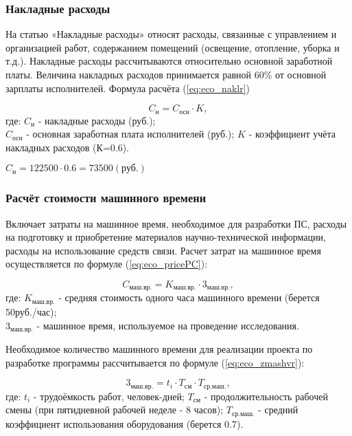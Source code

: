 \subsubsection*{Накладные расходы}
На статью «Накладные расходы» относят расходы, связанные с управлением и организацией работ, содержанием помещений
(освещение, отопление, уборка и т.д.). Накладные расходы рассчитываются относительно основной заработной платы. Величина
накладных расходов принимается равной 60\% от основной зарплаты исполнителей. Формула расчёта (\ref{eq:eco_naklr})

\begin{equation}
C_{\mbox{н}} = C_{\mbox{осн}} \cdot K,
\label{eq:eco_naklr}
\end{equation}
где:	${C_{\mbox{н}}}$ - накладные расходы (руб.); \\
	${C_{\mbox{осн}}}$ - основная заработная плата исполнителей (руб.);
	${K}$ - коэффициент учёта накладных расходов (К=0.6).

\begin{center}
${C_{\mbox{н}} = 122500 \cdot 0.6 = 73500 (\mbox{руб.})}$
\end{center}

\subsubsection*{Расчёт стоимости машинного времени}
Включает затраты на машинное время, необходимое для разработки ПС, расходы на подготовку и приобретение материалов
научно-технической информации, расходы на использование средств связи. Расчет затрат на машинное время осуществляется
по формуле (\ref{eq:eco_pricePC}):

\begin{equation}
C_{\mbox{маш.вр.}} = K_{\mbox{маш.вр.}} \cdot 3_{\mbox{маш.вр.}},
\label{eq:eco_pricePC}
\end{equation}
где:	${K_{\mbox{маш.вр.}}}$ - средняя стоимость одного часа машинного времени (берется 50руб./час); \\
	${3_{\mbox{маш.вр.}}}$ - машинное время, используемое на проведение исследования.	

Необходимое количество машинного времени для реализации проекта по разработке программы рассчитывается по формуле (\ref{eq:eco_zmashvr}):

\begin{equation}
3_{\mbox{маш.вр.}} = t_i \cdot T_{\mbox{см}} \cdot T_{\mbox{ср.маш.}},
\label{eq:eco_zmashvr}
\end{equation}
где:	${t_i}$ - трудоёмкость работ, человек-дней;
	${T_{\mbox{см}}}$ - продолжительность рабочей смены (при пятидневной рабочей неделе - 8 часов);
	${T_{\mbox{ср.маш.}}}$ - средний коэффициент использования оборудования (берется 0.7).

